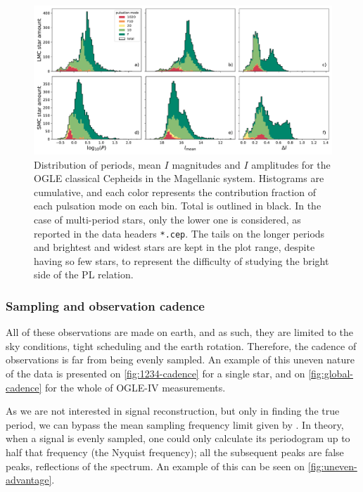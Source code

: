 \begin{figure}
	\centering
	\includegraphics[width=\textwidth]{img/clouds_histogram_PIdI.pdf}
	\caption[Distribution of signal properties for classical Cepheids in the Magellanic clouds]{
		Distribution of periods, mean $I$ magnitudes and $I$ amplitudes for the OGLE classical Cepheids in the Magellanic system.
		Histograms are cumulative, and each color represents the contribution fraction of each pulsation mode on each bin.
		Total is outlined in black.
		In the case of multi-period stars, only the lower one is considered, as reported in the data headers \texttt{*.cep}.
		The tails on the longer periods and brightest and widest stars are kept in the plot range, despite having so few stars,
		to represent the difficulty of studying the bright side of the PL relation.
	}
	\label{fig:pidi-hist}
\end{figure}


\subsubsection{Sampling and observation cadence \label{sec:sampling}}

All of these observations are made on earth, and as such,
they are limited to the sky conditions, tight scheduling and the earth rotation.
Therefore, the cadence of observations is far from being evenly sampled.
An example of this uneven nature of the data is presented on \autoref{fig:1234-cadence} for a single star,
and on \autoref{fig:global-cadence} for the whole of OGLE-IV measurements.

As we are not interested in signal reconstruction, but only in finding the true period,
we can bypass the mean sampling frequency limit given by \cite{Marvasti2001}.
In theory, when a signal is evenly sampled, one could only calculate its periodogram up to half that frequency (the Nyquist frequency);
all the subsequent peaks are false peaks, reflections of the spectrum. 
An example of this can be seen on \autoref{fig:uneven-advantage}.

